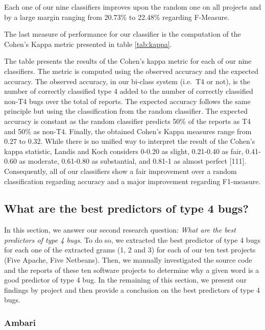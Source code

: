 \documentclass[12pt]{report}
\begin{document}


Each one of our nine classifiers improves upon the random one on all
projects and by a large margin ranging from 20.73\% to 22.48\% regarding
F-Measure.

The last measure of performance for our classifier is the computation of
the Cohen's Kappa metric presented in table \ref{tab:kappa}.



The table presents the results of the Cohen's kappa metric for each of
our nine classifiers. The metric is computed using the observed accuracy
and the expected accuracy. The observed accuracy, in our bi-class system
(i.e.~T4 or not), is the number of correctly classified type 4 added to
the number of correctly classified non-T4 bugs over the total of
reports. The expected accuracy follows the same principle but using the
classification from the random classifier. The expected accuracy is
constant as the random classifier predicts 50\% of the reports as T4 and
50\% as non-T4. Finally, the obtained Cohen's Kappa measures range from
0.27 to 0.32. While there is no unified way to interpret the result of
the Cohen's kappa statistic, Landis and Koch considers 0-0.20 as slight,
0.21-0.40 as fair, 0.41-0.60 as moderate, 0.61-0.80 as substantial, and
0.81-1 as almost perfect {[}111{]}. Consequently, all of our classifiers
show a fair improvement over a random classification regarding accuracy
and a major improvement regarding F1-measure.

\subsection{What are the best predictors of type 4
bugs?}\label{what-are-the-best-predictors-of-type-4-bugs}

In this section, we answer our second research question: \emph{What are
the best predictors of type 4 bugs}. To do so, we extracted the best
predictor of type 4 bugs for each one of the extracted grams (1, 2 and
3) for each of our ten test projects (Five Apache, Five Netbeans). Then,
we manually investigated the source code and the reports of these ten
software projects to determine why a given word is a good predictor of
type 4 bug. In the remaining of this section, we present our findings by
project and then provide a conclusion on the best predictors of type 4
bugs.

\subsubsection{Ambari}\label{ambari}
\end{document}
